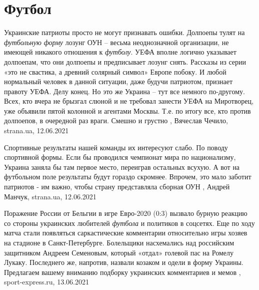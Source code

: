  
 
 
 
 
\chapter{Футбол}

Украинские патриоты просто не могут признавать ошибки.  Долпоепы тулят на
\emph{футбольную форму} лозунг ОУН – весьма неоднозначной организации, не имеющей
никакого отношения к \emph{футболу}. УЕФА вполне логично указывает долпоепам, что они
долпоепы и предписывает лозунг снять. Рассказы из серии «это не свастика, а
древний солярный символ» Европе побоку. И любой нормальный человек в данной
ситуации, даже будучи патриотом, признает правоту УЕФА. Делу конец.  Но это же
Украина – тут все немного по-другому. Всех, кто вчера не брызгал слюной и не
требовал занести УЕФА на Миротворец, уже объявили пятой колонной и агентами
Москвы. Т.е. по итогу все, кто против долпоепов, в очередной раз враги. Смешно
и грустно
, 
Вячеслав Чечило, strana.ua, 12.06.2021

Спортивные результаты нашей команды их интересуют слабо. По поводу спортивной
формы. Если бы проводился чемпионат мира по национализму, Украина заняла бы
там первое место, переиграв остальных всухую. А вот на футбольном поле
результаты будут гораздо скромнее.  Впрочем, это мало заботит патриотов - им
важно, чтобы страну представляла сборная ОУН
, 
Андрей Манчук, strana.ua, 12.06.2021

Поражение России от Бельгии в игре Евро-2020 (0:3) вызвало бурную реакцию со
стороны украинских любителей \emph{футбола} и политиков в соцсетях. Еще по ходу
матча стали появляться саркастические комментарии относительно игры хозяев на
стадионе в Санкт-Петербурге. Болельщики насхемались над российским защитником
Андреем Семеновым, который «отдал» голевой пас на Ромелу Лукаку. Последнего же,
напротив, назвали козаком и одели в форму Украины.  Предлагаем вашему вниманию
подборку украинских комментариев и мемов
,
sport-express.ru, 13.06.2021

